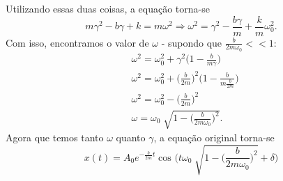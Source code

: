 \documentclass{article}
\begin{document}
Utilizando essas duas coisas, a equação torna-se 
  \[
    m\gamma ^{2} - b\gamma + k = m\omega ^{2} \Rightarrow \omega ^{2} = \gamma ^{2}-\frac{b\gamma }{m}+\frac{k}{m}\omega_{0}^{2}.
  \]
Com isso, encontramos o valor de \(\omega\) - supondo que \(\frac{b}{2m\omega_{0}} <<1\):
\begin{align*}
  &\omega ^{2} = \omega_{0}^{2} + \gamma ^{2}\biggl(1 - \frac{b}{m\gamma }\biggr)\\
  &\omega ^{2} = \omega_{0}^{2} + \biggl(\frac{b}{2m}\biggr)^{2}\biggl(1-\frac{b}{m \frac{b}{2m}}\biggr)\\
  &\omega ^{2} = \omega_{0}^{2} - \biggl(\frac{b}{2m}\biggr)^{2}\\
  &\omega  = \omega_{0}\sqrt[]{1-\biggl(\frac{b}{2m\omega_{0}}\biggr)^{2}}.
\end{align*}
  Agora que temos tanto \(\omega \) quanto \(\gamma \), a equação original torna-se 
    \[
      \boxed{x(t) = A_{0}e^{-\frac{b}{2m}t}\cos^{}{\biggl(t\omega_{0}\sqrt[]{1-\biggl(\frac{b}{2m\omega_{0}}\biggr)^{2}}+\delta \biggr)}}
    \]
\end{document}
